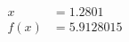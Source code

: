 \documentclass[preview]{standalone}
\begin{document}
\begin{align*}
x &= 1.2801\\f(x) &= 5.9128015
\end{align*}
\end{document}
